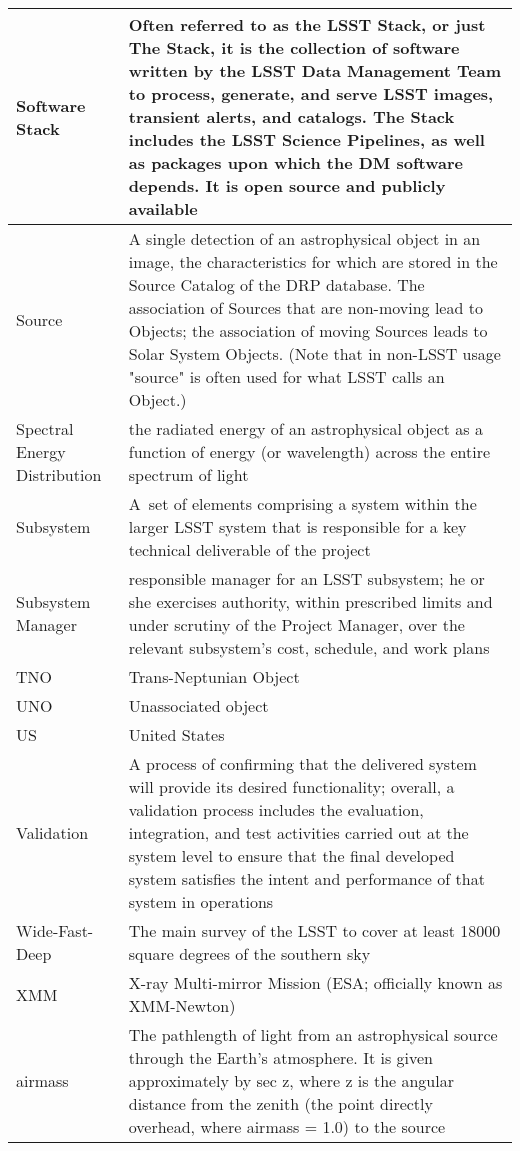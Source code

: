 \begin{longtable}{|p{}|p{}|}
Software Stack & Often referred to as the \gls{LSST} Stack, or just The Stack, it is the collection of software written by the \gls{LSST} \gls{Data Management} Team to process, generate, and serve \gls{LSST} images, \gls{transient} alerts, and catalogs. The Stack includes the \gls{LSST} \gls{Science Pipelines}, as well as packages upon which the \gls{DM} software depends. It is open source and publicly available \\\hline
Source & A single detection of an astrophysical object in an image, the characteristics for which are stored in the \gls{Source} Catalog of the \gls{DRP} database. The association of Sources that are non-moving lead to Objects; the association of moving Sources leads to Solar System Objects. (Note that in non-LSST usage "source" is often used for what \gls{LSST} calls an \gls{Object}.) \\\hline
Spectral Energy Distribution & the radiated energy of an astrophysical object as a function of energy (or wavelength) across the entire spectrum of light \\\hline
Subsystem & A set of elements comprising a system within the larger \gls{LSST} system that is responsible for a key technical deliverable of the project \\\hline
Subsystem Manager & responsible manager for an LSST subsystem; he or she exercises authority, within prescribed limits and under scrutiny of the Project Manager, over the relevant subsystem's cost, schedule, and work plans \\\hline
TNO & Trans-Neptunian \gls{Object} \\\hline
UNO & Unassociated object \\\hline
US & United States \\\hline
Validation & A process of confirming that the delivered system will provide its desired functionality; overall, a validation process includes the evaluation, integration, and test activities carried out at the system level to ensure that the final developed system satisfies the intent and performance of that system in operations \\\hline
Wide-Fast-Deep & The main survey of the \gls{LSST} to cover at least 18000 square degrees of the southern sky \\\hline
XMM & X-ray Multi-mirror Mission (\gls{ESA}; officially known as \gls{XMM}-Newton) \\\hline
airmass & The pathlength of light from an astrophysical source through the Earth's atmosphere. It is given approximately by sec z, where z is the angular distance from the zenith (the point directly overhead, where \gls{airmass} = 1.0) to the source \\\hline

\end{longtable}
